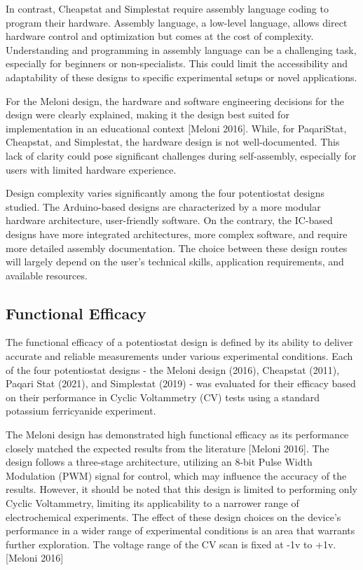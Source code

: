 \documentclass{article}
\begin{document}
In contrast, Cheapstat and Simplestat require assembly language coding to program their hardware. Assembly language, a low-level language, allows direct hardware control and optimization but comes at the cost of complexity. Understanding and programming in assembly language can be a challenging task, especially for beginners or non-specialists. This could limit the accessibility and adaptability of these designs to specific experimental setups or novel applications.

For the Meloni design, the hardware and software engineering decisions for the design were clearly explained, making it the design best suited for implementation in an educational context [Meloni 2016]. While, for PaqariStat, Cheapstat, and Simplestat, the hardware design is not well-documented. This lack of clarity could pose significant challenges during self-assembly, especially for users with limited hardware experience. 

Design complexity varies significantly among the four potentiostat designs studied. The Arduino-based designs are characterized by a more modular hardware architecture, user-friendly software. On the contrary, the IC-based designs have more integrated architectures, more complex software, and require more detailed assembly documentation. The choice between these design routes will largely depend on the user's technical skills, application requirements, and available resources.

\subsection*{Functional Efficacy}
The functional efficacy of a potentiostat design is defined by its ability to deliver accurate and reliable measurements under various experimental conditions. Each of the four potentiostat designs - the Meloni design (2016), Cheapstat (2011), Paqari Stat (2021), and Simplestat (2019) - was evaluated for their efficacy based on their performance in Cyclic Voltammetry (CV) tests using a standard potassium ferricyanide experiment.

The Meloni design has demonstrated high functional efficacy as its performance closely matched the expected results from the literature [Meloni 2016]. The design follows a three-stage architecture, utilizing an 8-bit Pulse Width Modulation (PWM) signal for control, which may influence the accuracy of the results. However, it should be noted that this design is limited to performing only Cyclic Voltammetry, limiting its applicability to a narrower range of electrochemical experiments. The effect of these design choices on the device's performance in a wider range of experimental conditions is an area that warrants further exploration. The voltage range of the CV scan is fixed at -1v to +1v. [Meloni 2016]
\end{document}
